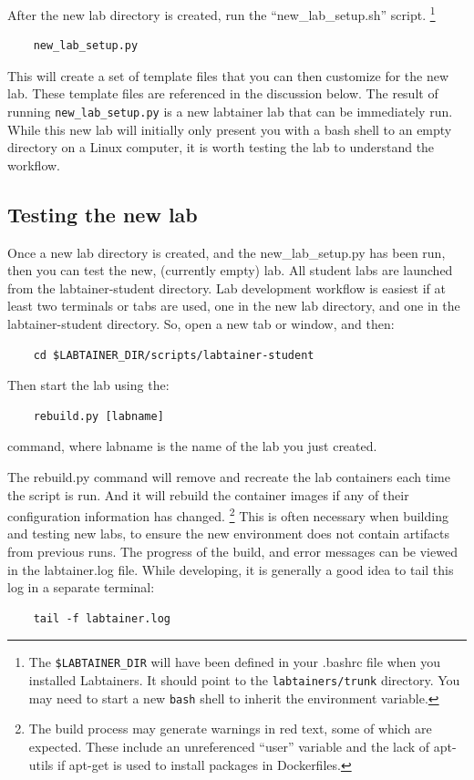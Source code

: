 \documentclass[12pt]{article}
\begin{document}
\noindent After the new lab directory is created, run the ``new\_lab\_setup.sh'' script.
\footnote {The {\tt \$LABTAINER\_DIR} will have been defined in your .bashrc
file when you installed Labtainers.  It should point to the {\tt labtainers/trunk}
directory.  You may need to start a new {\tt bash} shell to inherit the environment
variable.}

\begin{verbatim}
    new_lab_setup.py
\end{verbatim}
This will create a set of template files that you can then customize
for the new lab.  These template files are referenced in the discussion
below.
The result of running {\tt new\_lab\_setup.py} is a new labtainer lab that can be immediately run.  
While this new lab will initially only present you with a bash shell to an
empty directory on a Linux computer, it is worth testing the lab to understand the workflow.

\subsection{Testing the new lab}
Once a new lab directory is created, and the new\_lab\_setup.py has been run, then 
you can test the new, (currently empty) lab.  All student labs are launched from the
labtainer-student directory.  Lab development workflow is easiest if at least two
terminals or tabs are used, one in the new lab directory, and one in the labtainer-student
directory.  So, open a new tab or window, and then:

\begin{verbatim}
    cd $LABTAINER_DIR/scripts/labtainer-student
\end{verbatim}
Then start the lab using the:

\begin{verbatim}
    rebuild.py [labname] 
\end{verbatim}
command, where labname is the name of the lab you just created.  

The rebuild.py command will remove and recreate the lab containers
each time the script is run.  And it will rebuild the container images if any of their configuration 
information has changed.  \footnote{The build process may generate warnings in red text, some of which are expected.  
These include an unreferenced ``user'' variable and the lack of apt-utils if apt-get is used to install packages in 
Dockerfiles.}  This is often necessary when building and testing new labs, to ensure the
new environment does not contain artifacts from previous runs.
The progress of the build, and error messages can be viewed in 
the labtainer.log file.  While developing, it is generally a good idea to tail this log in
a separate terminal:
\begin{verbatim}
    tail -f labtainer.log
\end{verbatim}
\end{document}
